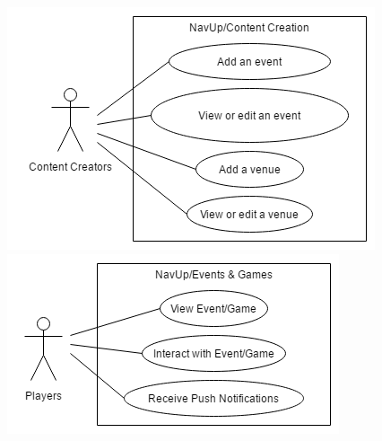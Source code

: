 \documentclass[english]{article}
\begin{document}
					   \includegraphics{NavUp_Content_Creation.png}
					   \includegraphics{NavUp_Events_and_Games.png}
\end{document}
